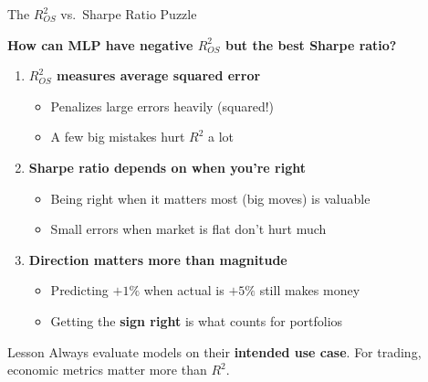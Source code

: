 \documentclass[10pt]{beamer}
\newcommand{\highlight}[1]{\textcolor{AccentOrange}{\textbf{#1}}}
\begin{document}
\begin{frame}{The $R^2_{OS}$ vs.\ Sharpe Ratio Puzzle}

  \textbf{How can MLP have negative $R^2_{OS}$ but the best Sharpe ratio?}

  \vspace{1em}
  \begin{enumerate}
    \item \textbf{$R^2_{OS}$ measures average squared error}
    \begin{itemize}
      \item Penalizes large errors heavily (squared!)
      \item A few big mistakes hurt $R^2$ a lot
    \end{itemize}

    \vspace{0.5em}
    \item \textbf{Sharpe ratio depends on \highlight{when} you're right}
    \begin{itemize}
      \item Being right when it matters most (big moves) is valuable
      \item Small errors when market is flat don't hurt much
    \end{itemize}

    \vspace{0.5em}
    \item \textbf{Direction matters more than magnitude}
    \begin{itemize}
      \item Predicting $+1\%$ when actual is $+5\%$ still makes money
      \item Getting the \highlight{sign right} is what counts for portfolios
    \end{itemize}
  \end{enumerate}

  \vspace{0.5em}
  \begin{block}{Lesson}
    Always evaluate models on their \highlight{intended use case}. For trading, economic metrics matter more than $R^2$.
  \end{block}
\end{frame}

\end{document}
